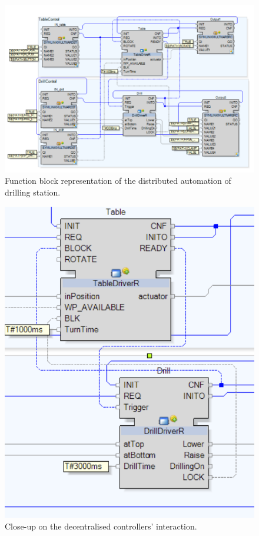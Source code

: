 \begin{bibunit}
\begin{figure}
    \centering
    \includegraphics[scale = 0.4]{MX_Papers/Paper2/images/fig2updated.PNG}
    \caption{Function block representation of the distributed automation of drilling station.}
    \label{figure:RealFBDiagram}
\end{figure}

\begin{figure}
    \centering
    \includegraphics[scale = 0.20]{MX_Papers/Paper2/images/DT_REAL_FB_CONTROLLERS.png}
    \caption{Close-up on the decentralised controllers' interaction.}
    \label{figure:RealFBControllers}
\end{figure}


\end{bibunit}

